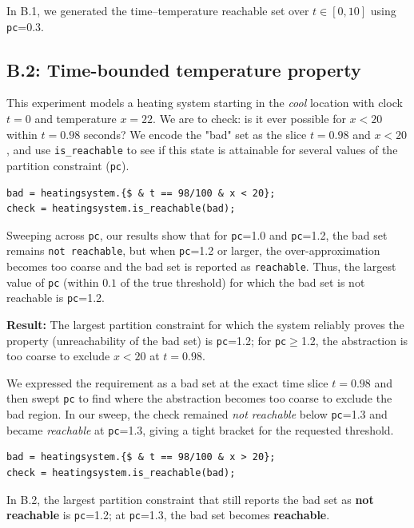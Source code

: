\documentclass[10pt]{article}
\newcommand{\afterprompt}{\par\medskip}
\begin{document}
\noindent In B.1, we generated the time--temperature reachable set over $t\in[0,10]$ using \texttt{pc}=0.3.

\subsection*{B.2: Time-bounded temperature property}

\afterprompt
\noindent This experiment models a heating system starting in the \emph{cool} location with clock $t=0$ and temperature $x=22$. We are to check: is it ever possible for $x<20$ within $t=0.98$ seconds? We encode the "bad" set as the slice $t=0.98$ and $x<20$, and use \texttt{is\_reachable} to see if this state is attainable for several values of the partition constraint (\texttt{pc}).

\begin{lstlisting}[style=phaver]
bad = heatingsystem.{$ & t == 98/100 & x < 20};
check = heatingsystem.is_reachable(bad);
\end{lstlisting}

Sweeping across \texttt{pc}, our results show that for \texttt{pc}=1.0 and \texttt{pc}=1.2, the bad set remains \texttt{not reachable}, but when \texttt{pc}=1.2 or larger, the over-approximation becomes too coarse and the bad set is reported as \texttt{reachable}. Thus, the largest value of \texttt{pc} (within $0.1$ of the true threshold) for which the bad set is not reachable is \texttt{pc}=1.2.

\noindent \textbf{Result:} The largest partition constraint for which the system reliably proves the property (unreachability of the bad set) is \texttt{pc}=1.2; for \texttt{pc}$\geq$1.2, the abstraction is too coarse to exclude $x<20$ at $t=0.98$.

\afterprompt
\noindent We expressed the requirement as a bad set at the exact time slice $t=0.98$ and then swept \texttt{pc} to find where the abstraction becomes too coarse to exclude the bad region. In our sweep, the check remained \emph{not reachable} below \texttt{pc}=1.3 and became \emph{reachable} at \texttt{pc}=1.3, giving a tight bracket for the requested threshold.

\begin{lstlisting}[style=phaver]
bad = heatingsystem.{$ & t == 98/100 & x > 20};
check = heatingsystem.is_reachable(bad);
\end{lstlisting}
\noindent In B.2, the largest partition constraint that still reports the bad set as \textbf{not reachable} is \texttt{pc}=1.2; at \texttt{pc}=1.3, the bad set becomes \textbf{reachable}.
\end{document}
